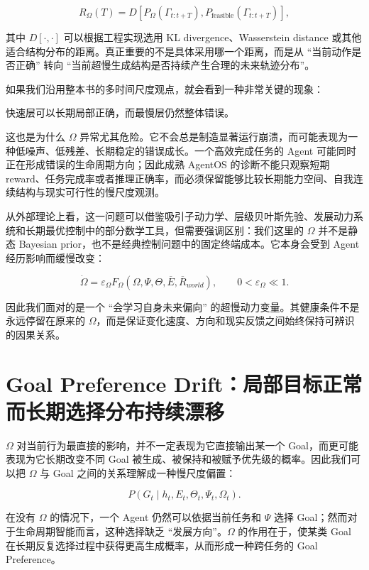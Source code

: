\[
R_{\Omega}(T)
=
D
\left[
P_{\Omega}(\Gamma_{t:t+T}),
P_{\mathrm{feasible}}(\Gamma_{t:t+T})
\right],
\]

其中 $D[\cdot,\cdot]$ 可以根据工程实现选用 KL divergence、Wasserstein distance 或其他适合结构分布的距离。真正重要的不是具体采用哪一个距离，而是从 ``当前动作是否正确'' 转向 ``当前超慢生成结构是否持续产生合理的未来轨迹分布''。

如果我们沿用整本书的多时间尺度观点，就会看到一种非常关键的现象：

\begin{statementbox}
快速层可以长期局部正确，而最慢层仍然整体错误。
\end{statementbox}

这也是为什么 $\Omega$ 异常尤其危险。它不会总是制造显著运行崩溃，而可能表现为一种低噪声、低残差、长期稳定的错误成长。一个高效完成任务的 Agent 可能同时正在形成错误的生命周期方向；因此成熟 AgentOS 的诊断不能只观察短期 reward、任务完成率或者推理正确率，而必须保留能够比较长期能力空间、自我连续结构与现实可行性的慢尺度观测。

从外部理论上看，这一问题可以借鉴吸引子动力学、层级贝叶斯先验、发展动力系统和长期最优控制中的部分数学工具，但需要强调区别：我们这里的 $\Omega$ 并不是静态 Bayesian prior，也不是经典控制问题中的固定终端成本。它本身会受到 Agent 经历影响而缓慢改变：

\[
\dot{\Omega}
=
\varepsilon_{\Omega}
F_{\Omega}
\left(
\Omega,
\Psi,
\Theta,
\overline{E},
\overline{R}_{world}
\right),
\qquad
0<\varepsilon_{\Omega}\ll 1.
\]

因此我们面对的是一个 ``会学习自身未来偏向'' 的超慢动力变量。其健康条件不是永远停留在原来的 $\Omega$，而是保证变化速度、方向和现实反馈之间始终保持可辨识的因果关系。

\section{Goal Preference Drift：局部目标正常而长期选择分布持续漂移}
\label{sec:goal_preference_drift}

$\Omega$ 对当前行为最直接的影响，并不一定表现为它直接输出某一个 Goal，而更可能表现为它长期改变不同 Goal 被生成、被保持和被赋予优先级的概率。因此我们可以把 $\Omega$ 与 Goal 之间的关系理解成一种慢尺度偏置：

\[
P(G_t\mid
h_t,E_t,\Theta_t,\Psi_t,\Omega_t).
\]

在没有 $\Omega$ 的情况下，一个 Agent 仍然可以依据当前任务和 $\Psi$ 选择 Goal；然而对于生命周期智能而言，这种选择缺乏 ``发展方向''。$\Omega$ 的作用在于，使某类 Goal 在长期反复选择过程中获得更高生成概率，从而形成一种跨任务的 Goal Preference。

